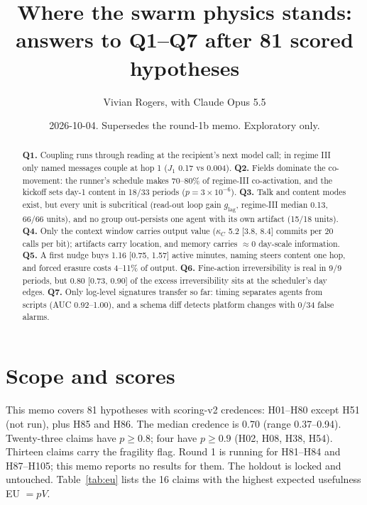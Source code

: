 \documentclass[aps,pre,reprint,10pt,nofootinbib]{revtex4-2}
\begin{document}
\title{Where the swarm physics stands: answers to Q1--Q7 after 81 scored hypotheses}
\author{Vivian Rogers, with Claude Opus 5.5}
\date[]{2026-10-04. Supersedes the round-1b memo. Exploratory only.}
\begin{abstract}
\textbf{Q1.} Coupling runs through reading at the recipient's next model call; in regime III only named messages couple at hop 1 ($J_1$ 0.17 vs 0.004).
\textbf{Q2.} Fields dominate the co-movement: the runner's schedule makes 70--80\% of regime-III co-activation, and the kickoff sets day-1 content in 18/33 periods ($p=3\times10^{-6}$).
\textbf{Q3.} Talk and content modes exist, but every unit is subcritical (read-out loop gain $g_\mathrm{lag}$, regime-III median 0.13, 66/66 units), and no group out-persists one agent with its own artifact (15/18 units).
\textbf{Q4.} Only the context window carries output value ($\kappa_C$ 5.2 [3.8, 8.4] commits per 20 calls per bit); artifacts carry location, and memory carries $\approx 0$ day-scale information.
\textbf{Q5.} A first nudge buys 1.16 [0.75, 1.57] active minutes, naming steers content one hop, and forced erasure costs 4--11\% of output.
\textbf{Q6.} Fine-action irreversibility is real in 9/9 periods, but 0.80 [0.73, 0.90] of the excess irreversibility sits at the scheduler's day edges.
\textbf{Q7.} Only log-level signatures transfer so far: timing separates agents from scripts (AUC 0.92--1.00), and a schema diff detects platform changes with 0/34 false alarms.
\end{abstract}
\maketitle

\section{Scope and scores}
This memo covers 81 hypotheses with scoring-v2 credences: H01--H80 except H51 (not run), plus H85 and H86. The median credence is 0.70 (range 0.37--0.94). Twenty-three claims have $p\ge0.8$; four have $p\ge0.9$ (H02, H08, H38, H54). Thirteen claims carry the fragility flag. Round 1 is running for H81--H84 and H87--H105; this memo reports no results for them. The holdout is locked and untouched. Table~\ref{tab:eu} lists the 16 claims with the highest expected usefulness EU $=pV$.
\end{document}

